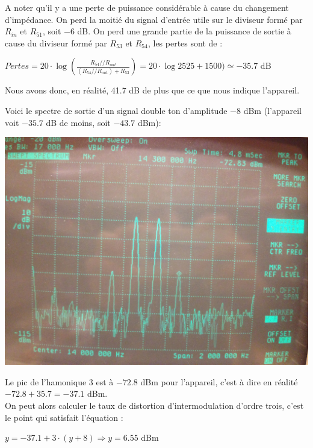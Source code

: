 \documentclass{article}
\begin{document}
A noter qu'il y a une perte de puissance considérable à cause du changement d'impédance. On perd la moitié du signal d'entrée utile sur le diviseur formé par $R_{in}$ et $R_{51}$, soit $-6$ dB. On perd une grande partie de la puissance de sortie à cause du diviseur formé par $R_{53}$ et $R_{54}$, les pertes sont de :
\begin{center}
$Pertes = 20\cdot \log (\frac{R_{54} // R_{out}}{(R_{54} // R_{out})+R_{53}}) = 20\cdot \log{25}{25+1500}) \simeq -35.7$ dB
\end{center}

Nous avons donc, en réalité, 41.7 dB de plus que ce que nous indique l'appareil.

Voici le spectre de sortie d'un signal double ton d'amplitude $-8$ dBm (l'appareil voit $-35.7$ dB de moins, soit $-43.7$ dBm):\\
\begin{center}
\includegraphics[width=0.7\linewidth]{8_3_4-8dbm.jpg}
\end{center}
Le pic de l'hamonique 3 est à $-72.8$ dBm pour l'appareil, c'est à dire en réalité $-72.8 + 35.7 = -37.1$ dBm.\\
On peut alors calculer le taux de distortion d'intermodulation d'ordre trois, c'est le point qui satisfait l'équation :
\begin{center}
$y = -37.1 + 3 \cdot (y+8) \Rightarrow y = 6.55$ dBm
\end{center}


%
%
%
%
\end{document}
